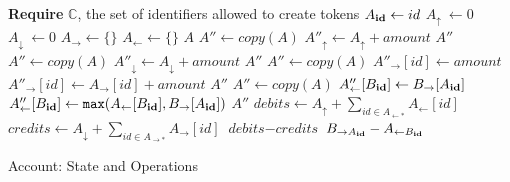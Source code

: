 \documentclass[9pt, oneside]{article}   	%
\begin{document}
\begin{algorithm}
\begin{algorithmic}[1]
   \State \textbf{Require} $\mathds{C}$, the set of identifiers allowed to create tokens
   \State
    	\State $A_{\scriptsize\textbf{id}} \leftarrow id$
	\State $A_\uparrow ~\leftarrow 0$       
	\State $A_\downarrow ~\leftarrow 0$   
	\State $A_\rightarrow \leftarrow \{ \}$ 
	\State $A_\leftarrow \leftarrow \{ \}$ 
    	\State \Return $A$
    \EndFunction
    \State
     
        \State $A'' \leftarrow \textit{copy}(A)$ 
		 \State $A''_\uparrow \leftarrow A_\uparrow + \textit{amount}$ 
	\EndIf
	\State \Return $A''$
    \EndFunction
    \State
        \State $A'' \leftarrow \textit{copy}(A)$
    	 \label{ln:burn-balance-check}
		 \State $A''_\downarrow \leftarrow A_\downarrow + \textit{amount}$ 
	\EndIf
	\State \Return $A''$
    \EndFunction
    \State
        \State $A'' \leftarrow \textit{copy}(A)$
    	  \label{ln:give-balance-check}
			\State $A''_{\rightarrow}[id] \leftarrow \textit{amount}$ 
		\Else
		         \State $A''_{\rightarrow}[id] \leftarrow A_{\rightarrow}[id] + \textit{amount}$ 
		\EndIf
	\EndIf
	\State \Return $A''$
    \EndFunction
    \State
        \State $A'' \leftarrow \textit{copy}(A)$
			 \State $A''_{\leftarrow}[B_{\scriptsize\textbf{id}}] \leftarrow B_{\rightarrow}[A_{\scriptsize\textbf{id}}]$
		\Else
			 \State $A''_{\leftarrow}[B_{\scriptsize\textbf{id}}] \leftarrow \texttt{max}(A_{\leftarrow}[B_{\scriptsize\textbf{id}}], B_{\rightarrow}[A_{\scriptsize\textbf{id}}])$ 
		\EndIf
        \EndIf
	\State \Return $A''$
    \EndFunction
    \State
        \State $\textit{debits} \leftarrow A_\uparrow + \sum\limits_{id \in A_{\leftarrow *}} A_{\leftarrow}[id]$ 
        \State $\textit{credits} \leftarrow A_\downarrow + \sum\limits_{id \in A_{\rightarrow *}} A_{\rightarrow}[id]$
        \State \Return $\textit{debits} - \textit{credits}$
    \EndFunction
    \State
        \State \Return $B_{\rightarrow A_{\tiny\textbf{id}}} - A_{\leftarrow B_{\tiny\textbf{id}}}$
    \EndFunction
    \end{algorithmic}
\caption{\label{alg:account} Account: State and Operations}
\end{algorithm}
\end{document}
